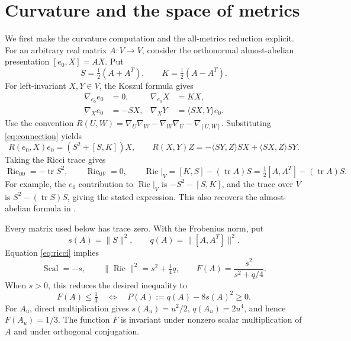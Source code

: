 \documentclass[11pt]{article}
\newcommand{\Ric}{\operatorname{Ric}}
\newcommand{\Scal}{\operatorname{Scal}}
\newcommand{\tr}{\operatorname{tr}}
\newcommand{\norm}[1]{\lVert #1\rVert}
\begin{document}
\section{Curvature and the space of metrics}

We first make the curvature computation and the all-metrics reduction
explicit. For an arbitrary real matrix \(A:V\to V\), consider the
orthonormal almost-abelian presentation \([e_0,X]=AX\). Put
\[
 S=\tfrac12(A+A^T),\qquad K=\tfrac12(A-A^T).
\]
For left-invariant \(X,Y\in V\), the Koszul formula gives
\begin{equation}\label{eq:connection}
\begin{aligned}
 \nabla_{e_0}e_0&=0,& \nabla_{e_0}X&=KX,\\
 \nabla_Xe_0&=-SX,& \nabla_XY&=\langle SX,Y\rangle e_0.
\end{aligned}
\end{equation}
Use the convention
\(R(U,W)=\nabla_U\nabla_W-\nabla_W\nabla_U-\nabla_{[U,W]}\).
Substituting \eqref{eq:connection} yields
\[
 R(e_0,X)e_0=(S^2+[S,K])X,\qquad
 R(X,Y)Z=-\langle SY,Z\rangle SX+\langle SX,Z\rangle SY.
\]
Taking the Ricci trace gives
\begin{equation}\label{eq:ricci}
 \Ric_{00}=-\tr S^2,\qquad
 \Ric_{0V}=0,\qquad
 \Ric|_V=[K,S]-(\tr A)S
       =\tfrac12[A,A^T]-(\tr A)S.
\end{equation}
For example, the \(e_0\) contribution to \(\Ric|_V\) is
\(-S^2-[S,K]\), and the trace over \(V\) is
\(S^2-(\tr S)S\), giving the stated expression.
This also recovers the almost-abelian formula in
\cite[equation (3)]{LWv2}.

Every matrix used below has trace zero. With the Frobenius norm, put
\[
 s(A)=\norm{S}^2,\qquad q(A)=\norm{[A,A^T]}^2.
\]
Equation \eqref{eq:ricci} implies
\begin{equation}\label{eq:reduction}
 \Scal=-s,\qquad \norm{\Ric}^2=s^2+\tfrac14q,\qquad
 F(A)=\frac{s^2}{s^2+q/4}.
\end{equation}
When \(s>0\), this reduces the desired inequality to
\begin{equation}\label{eq:P}
 F(A)\le\tfrac13
 \quad\Longleftrightarrow\quad
 P(A):=q(A)-8s(A)^2\ge0.
\end{equation}
For \(A_u\), direct multiplication gives
\(s(A_u)=u^2/2\), \(q(A_u)=2u^4\), and hence \(F(A_u)=1/3\).
The function \(F\) is invariant under nonzero scalar multiplication
of \(A\) and under orthogonal conjugation.
\end{document}
